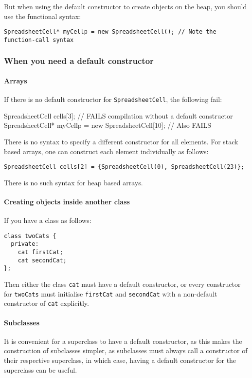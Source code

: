 \documentclass[a4paper,12pt]{article}
\begin{document}
But when using the default constructor to create objects on the heap, you should use the functional syntax:

\begin{lstlisting}
SpreadsheetCell* myCellp = new SpreadsheetCell(); // Note the function-call syntax
\end{lstlisting}

\subsubsection{When you need a default constructor}
\paragraph{Arrays}
If there is no default constructor for \lstinline|SpreadsheetCell|, the following fail:

\begin{lstinline}
  SpreadsheetCell cells[3]; // FAILS compilation without a default constructor
  SpreadsheetCell* myCellp = new SpreadsheetCell[10]; // Also FAILS
\end{lstinline}

There is no syntax to specify a different constructor for all elements. For stack based arrays, one can construct each element individually as follows:

\begin{lstlisting}[caption={Example of \emph{initialisers}}]
SpreadsheetCell cells[2] = {SpreadsheetCell(0), SpreadsheetCell(23)};
\end{lstlisting}

There is no such syntax for heap based arrays.

\paragraph{Creating objects inside another class}
If you have a class as follows:

\begin{lstlisting}
class twoCats {
  private:
    cat firstCat;
    cat secondCat;
};
\end{lstlisting}
Then either the class \lstinline|cat| must have a default constructor, or every constructor for \lstinline|twoCats| must initialise \lstinline|firstCat| and \lstinline|secondCat| with a non-default constructor of \lstinline|cat| explicitly.

\paragraph{Subclasses}
It is convenient for a superclass to have a default constructor, as this makes the construction of subclasses simpler, as subclasses must always call a constructor of their respective superclass, in which case, having a default constructor for the superclass can be useful.
\end{document}
